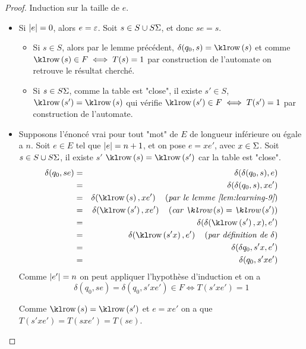 \begin{proof}
	Induction sur la taille de $e$.

	\begin{itemize}
		\item Si $|e| = 0$, alors $e = \varepsilon$.
		      Soit $s \in S \cup S \Sigma$, et donc $se = s$.
		      \begin{itemize}
			      \item Si $s \in S$, alors par le lemme précédent,
			            $\delta(q_0, s) = \row {s}$ et
			            comme $\row {s} \in F \iff T(s) = 1$ par construction de l'automate on retrouve le résultat cherché.
			      \item Si $s \in S\Sigma$, comme la table est "close", il existe $s' \in S$, \tq $\row {s'} = \row s$ qui vérifie
			            $\row {s'} \in F \iff T(s') = 1$ par construction de l'automate.

		      \end{itemize}
		\item Supposons l'énoncé vrai pour tout "mot" de $E$ de longueur inférieure ou égale a $n$. Soit $e \in E$ tel que $|e| = n + 1$,
		      et on pose $e = x e'$, avec $x \in \Sigma$. Soit $s \in S \cup S\Sigma$, il existe
		      $s'$ \tq $\row s = \row {s'}$ car la table est "close".
		      \begin{eqnarray*}
			      \delta(q_0, se) &=& \delta(\delta(q_0,s),e) \\
			      &=& \delta(\delta(q_0,s),xe') \\
			      &=& \delta(\row s,xe') \reason{par le lemme \ref{lem:learning-9}} \\
			      &=& \delta(\row {s'},xe') \reason{car $\row s = \row {s'}$} \\
			      &=& \delta(\delta (\row {s'}, x), e') \\
			      &=& \delta(\row {s'x}, e') \reason {par définition de $\delta$}\\
			      &=& \delta(\delta{q_0, s'x}, e') \\
			      &=& \delta(q_0, s'x e')
		      \end{eqnarray*}
		      Comme $|e'| = n$ on peut appliquer l'hypothèse d'induction et on a
		      $$ \delta(q_0, se) = \delta(q_0, s'x e') \in F \iff T(s'x e') = 1$$

		      Comme $\row s = \row {s'}$  et $e = xe'$ on a que $T(s'xe') = T(sxe') = T(se)$.
	\end{itemize}
\end{proof}

